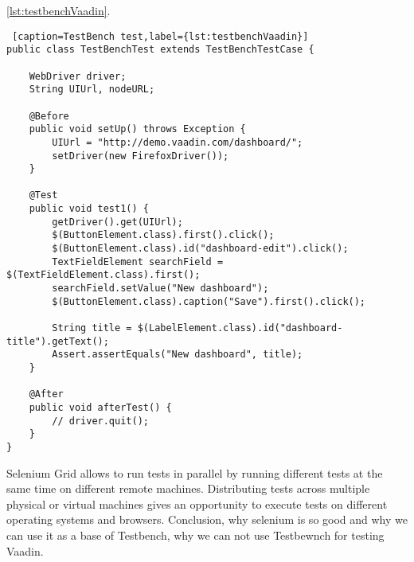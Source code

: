 	
	\ref{lst:testbenchVaadin}.
	\lstset{style=a1listing}
  	\begin{lstlisting} [caption=TestBench test,label={lst:testbenchVaadin}]
public class TestBenchTest extends TestBenchTestCase {

    WebDriver driver;
    String UIUrl, nodeURL;

    @Before
    public void setUp() throws Exception {
        UIUrl = "http://demo.vaadin.com/dashboard/";
        setDriver(new FirefoxDriver());
    }

    @Test
    public void test1() {
        getDriver().get(UIUrl);
        $(ButtonElement.class).first().click();
        $(ButtonElement.class).id("dashboard-edit").click();
        TextFieldElement searchField = $(TextFieldElement.class).first();
        searchField.setValue("New dashboard");
        $(ButtonElement.class).caption("Save").first().click();

        String title = $(LabelElement.class).id("dashboard-title").getText();
        Assert.assertEquals("New dashboard", title);
    }

    @After
    public void afterTest() {
        // driver.quit();
    }
}  	
\end{lstlisting}
  	Selenium Grid allows to run tests in parallel by running different tests at the same time on different remote machines. Distributing tests across 
	multiple physical or virtual machines gives an opportunity to execute tests 
	on different operating systems and browsers. 	Conclusion, why selenium is so
	good and why we can use it as a base of Testbench, why we can not use Testbewnch for testing Vaadin. 